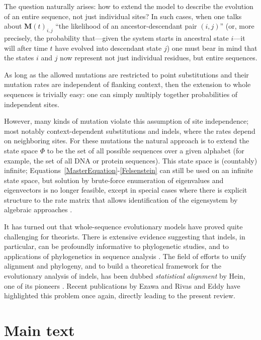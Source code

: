 \documentclass{bmcart}
\newcommand{\matr}[1]{\mathbf{#1}}
\newcommand{\statespace}{\Phi}
\newcommand{\condmatrix}{\matr{M}}
\begin{document}
The question naturally arises: how to extend the model to describe the evolution of an entire sequence,
not just individual sites?
In such cases, when one talks about $\condmatrix(t)_{i,j}$ ``the likelihood of an ancestor-descendant pair $(i,j)$''
(or, more precisely, the probability that---given the system starts in ancestral state $i$---it will after time $t$ have evolved into descendant state $j$)
one must bear in mind that the states $i$ and $j$ now represent not just individual residues, but entire sequences.

As long as the allowed mutations are restricted to point substitutions
and their mutation rates are independent of flanking context,
then the extension to whole sequences is trivially easy:
one can simply multiply together probabilities of independent sites.

However, many kinds of mutation violate this assumption of site independence;
most notably context-dependent substitutions and indels, where the rates depend on neighboring sites.
For these mutations the natural approach is to extend the state space $\statespace$
to be the set of all possible sequences over a given alphabet
(for example, the set of all DNA or protein sequences).
This state space is (countably) infinite;
Equations~\ref{MasterEquation}-\ref{Felsenstein} can still be used
on an infinite state space,
but solution by brute-force enumeration of eigenvalues and eigenvectors is no longer feasible,
except in special cases where there is explicit structure to the rate matrix that allows identification of the eigensystem by algebraic approaches
\cite{LunterHein04,pmid21827770}.

It has turned out that whole-sequence evolutionary models have proved quite challenging for theorists.
There is extensive evidence suggesting that indels, in particular, can be profoundly informative to phylogenetic studies,
and to applications of phylogenetics in sequence analysis \cite{pmid8445636,pmid15276848,pmid18578882,pmid23475937,pmid19958081,pmid16354754}.
The field of efforts to unify alignment and phylogeny,
and to build a theoretical framework for the evolutionary analysis of indels,
has been dubbed
{\em statistical alignment} by Hein, one of its pioneers \cite{HeinEtal2000}.
Recent publications by Ezawa \cite{Ezawa2016b,Ezawa2016a,Ezawa2016bErratum} and Rivas and Eddy \cite{RivasEddy2015} have highlighted this problem once again, directly leading to the present review.

\section*{Main text}
\end{document}

